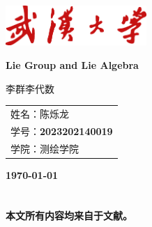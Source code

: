 \documentclass[12pt, onecolumn]{article}
\title{\normf{编程：观测值逐次更新的扩展卡尔曼滤波器}}
\author{\normf 姓名：陈烁龙\;\;\;学号：2023202140019\;\;\;学院：测绘学院}
\date{\normf{\today}}
\newcommand\normf{\fangsong}
\begin{document}
	\begin{titlepage}
	    \centering
	    \includegraphics[width=0.4\textwidth]{whu_red.png}\par\vspace{1cm}
	    \vspace{4cm}
	    {\huge\kaishu\bfseries Lie Group and Lie Algebra\par 李群李代数 \par}
	    \vspace{3cm}
	    {\Large\kaishu 
	    \begin{center}\begin{tabular}{l}
	    姓名：陈烁龙\\
	    学号：\bfseries 2023202140019\\
	    学院：测绘学院
	    \end{tabular}\end{center}
	     \par}
	    
	
	    \vfill
	
	    {\large\kaishu\bfseries \today\par}
	\end{titlepage}
 		\thispagestyle{empty}
		\clearpage
		
		\tableofcontents
		\newpage
		\listoffigures
		
		\clearpage
		\setcounter{page}{1}
	
	\section{\normf{基础知识}}
	\normf\bfseries
	本文所有内容均来自于文献\cite{sola2018micro}。
	
\end{document}
